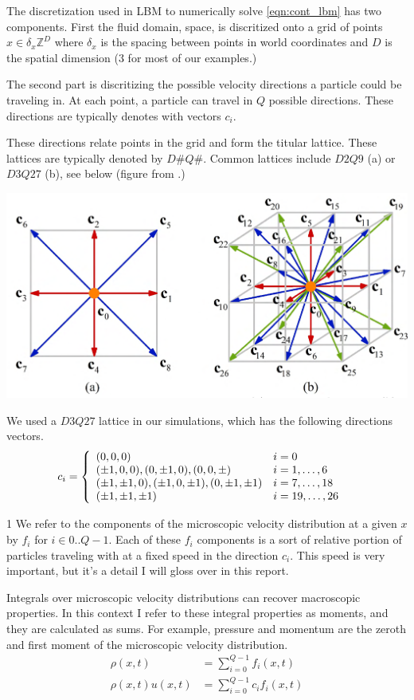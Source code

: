 The discretization used in LBM to numerically 
solve \ref{eqn:cont_lbm} has two components.
First the fluid domain, space, is 
discritized onto a
grid of points $x \in \delta_x \mathbb{Z}^D$
where $\delta_x$ is the spacing between points in world coordinates
and $D$ is the spatial dimension ($3$ for most of our examples.)

The second part is discritizing the possible velocity directions 
a particle could be traveling in. 
At each point, a particle can travel in $Q$ possible directions.
These directions are typically denotes with vectors $c_i$.

These directions relate points in the grid and form the titular lattice.
These lattices are typically denoted by $D\#Q\#$.
Common lattices include $D2Q9$ (a) or $D3Q27$ (b), see below (figure from \cite{Li2020}.)
\begin{center}
\includegraphics[width=0.6\linewidth]{lattice_figure.png}
\end{center}
We used a $D3Q27$ lattice in our simulations, which has the following
directions vectors.
\begin{align*}
  c_i &= \left\{
  \begin{array}{l l}
  (0, 0, 0) & i = 0\\
  (\pm 1, 0, 0), (0, \pm 1, 0), (0, 0, \pm) & i = 1,\ldots, 6\\
  (\pm 1, \pm 1, 0), (\pm 1, 0, \pm 1), (0, \pm 1, \pm 1)
                                            & i = 7, \ldots, 18 \\
  (\pm 1, \pm 1, \pm 1) & i = 19, \ldots, 26
  \end{array}
  \right.
\end{align*}


1 We refer to the components of 
the microscopic velocity distribution at a given $x$ by
$f_i$ for $i \in 0..Q - 1$.
Each of these $f_i$ components is a sort of relative 
portion of particles traveling with at a 
fixed speed in the direction $c_i$.
This speed is very important, but it's a detail 
I will gloss over in this report.

Integrals over microscopic velocity distributions can 
recover macroscopic properties.
In this context I refer to these integral properties as moments, 
and they are calculated as sums. 
For example, pressure and momentum are the zeroth and first moment 
of the microscopic velocity distribution.
\begin{align}
  \rho(x, t) &= \sum_{i = 0}^{Q - 1} f_i(x, t) \\
  \rho(x,t)u(x,t) &= \sum_{i = 0}^{Q - 1}c_i f_i(x, t)
\end{align}

